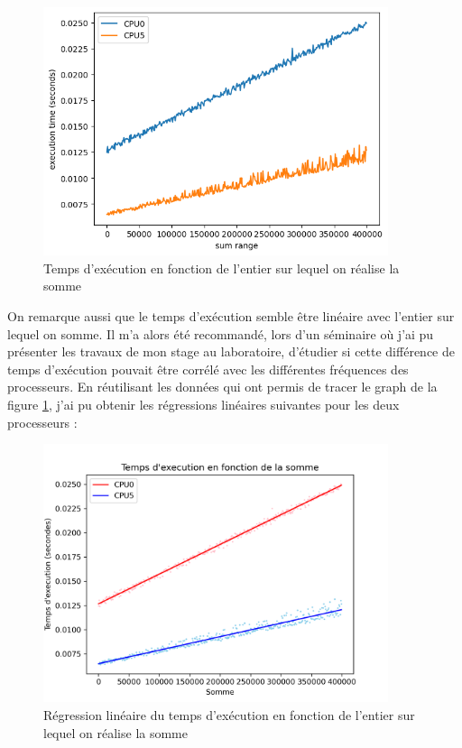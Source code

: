 \begin{figure}[H]
    \centering
    \includegraphics[width=0.9\textwidth]{Images/graphSum0and5.png}
    \caption{Temps d'exécution en fonction de l'entier sur lequel on réalise la somme}
    \label{fig:sum_int}    
\end{figure}


On remarque aussi que le temps d'exécution semble être linéaire avec l'entier sur lequel on somme. Il m'a alors été recommandé, lors d'un séminaire où j'ai pu présenter les travaux de mon stage au laboratoire, d'étudier si cette différence de temps d'exécution pouvait être corrélé avec les différentes fréquences des processeurs. En réutilisant les données qui ont permis de tracer le graph de la figure \ref{fig:sum_int}, j'ai pu obtenir les régressions linéaires suivantes pour les deux processeurs :

\begin{figure}[H]
    \centering
    \includegraphics[width=0.9\textwidth]{Images/linear_regression.png}
    \caption{Régression linéaire du temps d'exécution en fonction de l'entier sur lequel on réalise la somme}
\end{figure}

